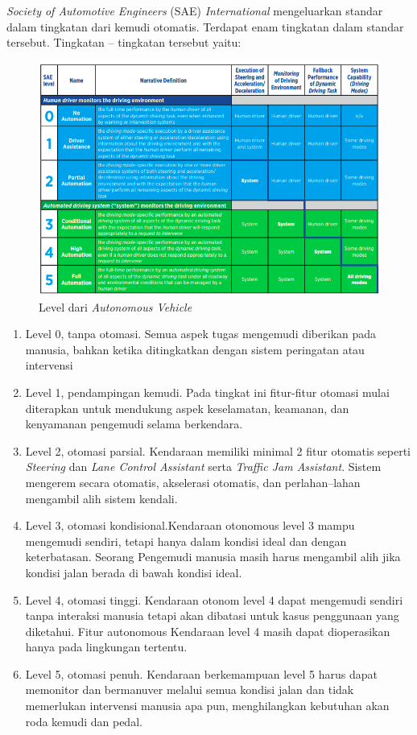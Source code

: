 \textit{Society of Automotive Engineers }(SAE) \textit{International }mengeluarkan standar dalam tingkatan dari kemudi	otomatis. Terdapat enam tingkatan dalam standar tersebut. Tingkatan – tingkatan tersebut yaitu:\cite{cit:sae_def}
\begin{figure}[H] 
	\centering
	\includegraphics[width=.7\linewidth]{images/autonomous_vehicle_level}
	\caption{Level dari \textit{Autonomous Vehicle }}
	\label{fig:autonomous_vehicle_level}
\end{figure}

\begin{enumerate}[leftmargin=2\parindent]
	\item Level 0, tanpa otomasi. Semua	aspek tugas mengemudi diberikan pada manusia, bahkan ketika ditingkatkan dengan sistem peringatan atau intervensi
	\item Level 1, pendampingan kemudi. Pada tingkat ini fitur-fitur otomasi mulai diterapkan untuk mendukung aspek keselamatan, keamanan, dan kenyamanan pengemudi selama berkendara.

	\item Level 2, otomasi parsial. Kendaraan memiliki minimal 2 fitur otomatis seperti \textit{Steering }dan \textit{Lane Control Assistant }serta \textit{Traffic Jam Assistant}. Sistem mengerem secara otomatis, akselerasi otomatis, dan perlahan–lahan mengambil alih sistem kendali.
	\item Level 3, otomasi kondisional.Kendaraan otonomous level 3 mampu mengemudi sendiri, tetapi hanya dalam kondisi ideal dan dengan keterbatasan. Seorang Pengemudi manusia masih harus mengambil alih jika kondisi jalan berada di bawah kondisi ideal.
	\item Level 4, otomasi tinggi. Kendaraan otonom level 4 dapat mengemudi sendiri tanpa interaksi manusia tetapi akan dibatasi untuk kasus penggunaan yang diketahui. Fitur autonomous Kendaraan level 4 masih dapat dioperasikan hanya pada lingkungan tertentu. 
	\item Level 5, otomasi penuh. Kendaraan berkemampuan level 5 harus dapat memonitor dan bermanuver melalui semua kondisi jalan dan tidak memerlukan intervensi manusia apa pun, menghilangkan kebutuhan akan roda kemudi dan pedal.
\end{enumerate}

